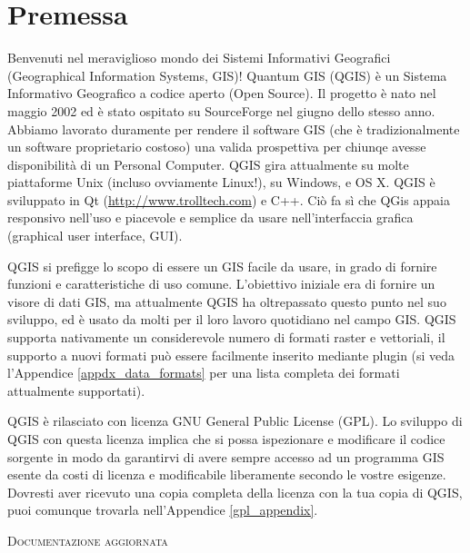 
\section{Premessa}\label{label_forward}
\setcounter{page}{1}


Benvenuti nel meraviglioso mondo dei Sistemi Informativi Geografici (Geographical Information Systems, GIS)! Quantum GIS (QGIS) è un Sistema
Informativo Geografico a codice aperto (Open Source). Il progetto
è nato nel maggio 2002 ed è stato ospitato su SourceForge
nel giugno dello stesso anno. Abbiamo lavorato duramente per rendere
il software GIS (che è tradizionalmente un software proprietario costoso)
una valida prospettiva per chiunqe avesse disponibilità di un Personal
Computer. QGIS gira attualmente su molte piattaforme Unix (incluso ovviamente Linux!), su Windows,
e OS X. QGIS è sviluppato in Qt (\url{http://www.trolltech.com})
e C++. Ciò fa sì che QGis appaia responsivo nell'uso e piacevole e
semplice da usare nell'interfaccia grafica (graphical user interface,
GUI).

QGIS si prefigge lo scopo di essere un GIS facile da usare, in grado
di fornire funzioni e caratteristiche di uso comune. L’obiettivo iniziale
era di fornire un visore di dati GIS, ma attualmente QGIS ha oltrepassato questo
punto nel suo sviluppo, ed è usato da molti per il loro lavoro quotidiano nel campo GIS.
QGIS supporta nativamente un considerevole numero di formati raster e vettoriali,
il supporto a nuovi formati può essere facilmente inserito mediante
plugin (si veda l'Appendice \ref{appdx_data_formats} per una lista
completa dei formati attualmente supportati).

QGIS è rilasciato con licenza GNU General Public License (GPL). Lo
sviluppo di QGIS con questa licenza implica che si possa ispezionare
e modificare il codice sorgente in modo da garantirvi di avere sempre accesso
ad un programma GIS esente da costi di licenza e modificabile liberamente secondo le
vostre esigenze. Dovresti aver ricevuto una copia completa della licenza
con la tua copia di QGIS, puoi comunque trovarla nell'Appendice \ref{gpl_appendix}.



\begin{Tip}\caption{\textsc{Documentazione aggiornata}}
\end{Tip}

